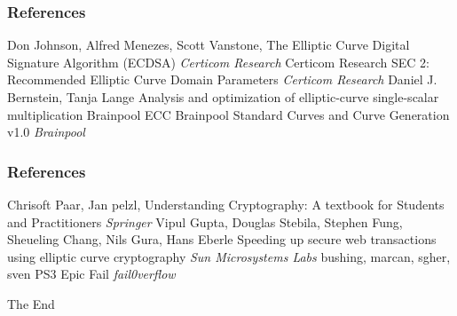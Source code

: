 \documentclass{beamer}
\begin{document}
\begin{frame}
\frametitle{References}
\footnotesize{
\begin{thebibliography}{99}
   Don Johnson, Alfred Menezes, Scott Vanstone,
 \newblock The Elliptic Curve Digital Signature Algorithm (ECDSA)
 \newblock \emph{Certicom Research}
   Certicom Research
 \newblock SEC 2: Recommended Elliptic Curve Domain Parameters
 \newblock \emph{Certicom Research}
    Daniel J. Bernstein, Tanja Lange
 \newblock Analysis and optimization of elliptic-curve single-scalar multiplication
   Brainpool
 \newblock ECC Brainpool Standard Curves and Curve Generation v1.0
 \newblock \emph{Brainpool}
\end{thebibliography}
}
\end{frame}
 
\begin{frame}
\frametitle{References}
\footnotesize{
\begin{thebibliography}{99}
    Chrisoft Paar, Jan pelzl,
 \newblock Understanding Cryptography: A textbook for Students and Practitioners
 \newblock \emph{Springer}
    Vipul Gupta, Douglas Stebila, Stephen Fung, Sheueling Chang, Nils Gura, Hans Eberle
 \newblock Speeding up secure web transactions using elliptic curve cryptography
 \newblock \emph{Sun Microsystems Labs}
     bushing, marcan, sgher, sven
 \newblock PS3 Epic Fail
 \newblock \emph{fail0verflow}
\end{thebibliography}
}
\end{frame}

 
\begin{frame}
\centerline{The End}
\end{frame}
\end{document}
